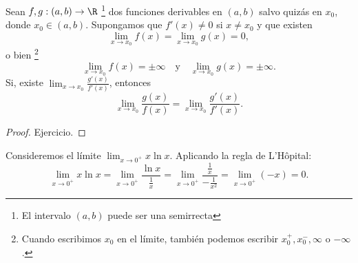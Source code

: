 \begin{ftheorem}
\normalfont Sean $\displaystyle f,g : \left(a,b\right) \to \R $ \footnote{El intervalo $\displaystyle \left(a,b\right) $ puede ser una semirrecta}  dos funciones derivables en $\displaystyle \left(a,b\right) $ salvo quizás en $\displaystyle x_{0} $, donde $\displaystyle x_{0} \in \left(a,b\right) $. Supongamos que $\displaystyle f'\left(x\right) \neq 0 $ si $\displaystyle x \neq x_{0} $ y que existen
\[\lim_{x \to x_{0}}f\left(x\right) = \lim_{x \to x_{0}}g\left(x\right) = 0 ,\]
o bien \footnote{Cuando escribimos $\displaystyle x_{0} $ en el límite, también podemos escribir $\displaystyle x_{0}^{+}, x_{0}^{-}, \infty $ o $\displaystyle -\infty $.} 
\[ \lim_{x \to x_{0}}f\left(x\right) = \pm \infty \quad \text{y} \quad \lim_{x \to x_{0}}g\left(x\right) = \pm \infty .\]
Si, existe $\displaystyle \lim_{x \to x_{0}}\frac{g'\left(x\right)}{f'\left(x\right)} $, entonces 
\[ \lim_{x \to x_{0}}\frac{g\left(x\right)}{f\left(x\right)} = \lim_{x \to x_{0}}\frac{g'\left(x\right)}{f'\left(x\right)} .\]
\end{ftheorem}
\begin{proof}
Ejercicio.
\end{proof}
\begin{eg}
\normalfont Consideremos el límite $\displaystyle \lim_{x \to 0^{+}}x\ln x $. Aplicando la regla de L'Hôpital:
\[ \lim_{x \to 0^{+}} x\ln x= \lim_{x \to 0^{+}}\frac{\ln x}{\frac{1}{x}} = \lim_{x \to 0^{+}} \frac{\frac{1}{x}}{-\frac{1}{x^{2}}} = \lim_{x \to 0^{+}} \left(- x\right) = 0 .\]
\end{eg}
